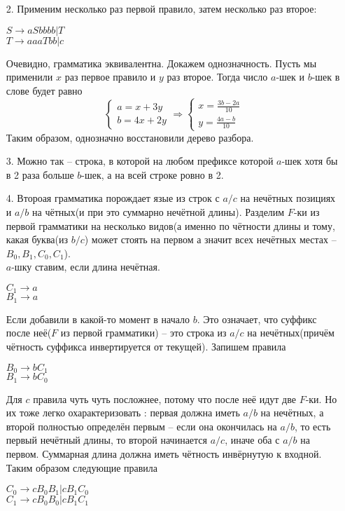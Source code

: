 \documentclass[12pt]{article}
\begin{document}
\bigskip

\begin{enumerate}
\item[2.] Применим несколько раз первой правило, затем несколько раз второе:
\begin{myquote}
$S \to aSbbbb |  T$\\
$T \to aaaTbb | c$
\end{myquote}
Очевидно, грамматика эквивалентна. Докажем однозначность. Пусть мы применили $x$ раз первое правило и $y$ раз второе. Тогда число $a$-шек и $b$-шек в слове будет равно\\
\begin{equation*}
 \begin{cases}
  a = x + 3y\\
  b = 4x + 2y
 \end{cases}
\Rightarrow
 \begin{cases}
   x = \frac{3b-2a}{10}\\
   y = \frac{4a-b}{10}
 \end{cases}
\end{equation*}
Таким образом, однозначно восстановили дерево разбора.
\item[3.] Можно так -- строка, в которой на любом префиксе которой $a$-шек хотя бы в 2 раза больше $b$-шек, а на всей строке ровно в 2.
\item[4.] Второая грамматика порождает язые из строк с $a/c$ на нечётных позициях и $a/b$ на чётных(и при это суммарно нечётной длины). Разделим $F$-ки из первой грамматики на несколько видов(а именно по чётности длины и тому, какая буква(из $b/c$) может стоять на первом а значит всех нечётных местах -- $B_0, B_1 , C_0, C_1$). \\
$a$-шку ставим, если длина нечётная.
 \begin{myquote}
$C_1 \to a$\\
$B_1 \to a$
\end{myquote}
Если добавили в какой-то момент в начало $b$. Это означает, что суффикс после неё($F$ из первой грамматики) -- это строка из $a/c$ на нечётных(причём чётность суффикса инвертируется от текущей). Запишем правила
 \begin{myquote}
$B_0 \to bC_1$\\
$B_1 \to bC_0$
\end{myquote}
Для $c$ правила чуть чуть посложнее, потому что после неё идут две $F$-ки. Но их тоже легко охарактеризовать : первая должна иметь $a/b$ на нечётных, а второй полностью определён первым -- если она окончилась на $a/b$, то есть первый нечётный длины, то второй начинается $a/c$, иначе оба с $a/b$ на первом. Суммарная длина должна иметь чётность инвёрнутую к входной. Таким образом следующие правила
 \begin{myquote}
$C_0 \to cB_0B_1|cB_1C_0$\\
$C_1 \to cB_0B_0 |cB_1C_1$
\end{myquote}
\end{enumerate}
\end{document}
